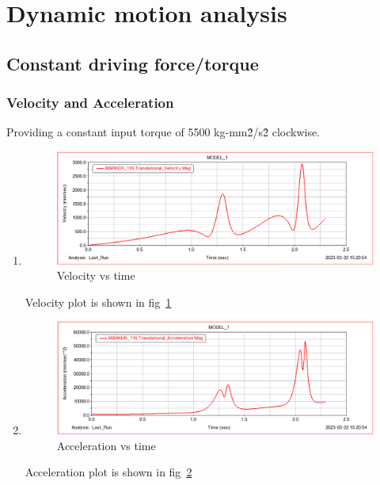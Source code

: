 \section{Dynamic motion analysis}
    \subsection{Constant driving force/torque}
        \subsubsection{Velocity and Acceleration}
            Providing a constant input torque of 5500 kg-mm\^2/s\^2 clockwise.
            \begin{enumerate}
                \item 
                    \begin{figure}[hbt!]
                        \centering
                        \includegraphics[width=0.9\columnwidth]{Images/Velocity_311.png}
                        \caption{Velocity vs time}
                        \label{fig:vel_1}
                    \end{figure}
                    Velocity plot is shown in fig~\ref{fig:vel_1}
                \item 
                    \begin{figure}[hbt!]
                        \centering
                        \includegraphics[width=0.9\columnwidth]{Images/Acceleration_311.png}
                        \caption{Acceleration vs time}
                        \label{fig:acc_1}
                    \end{figure}
                    Acceleration plot is shown in fig~\ref{fig:acc_1}
            \end{enumerate}
